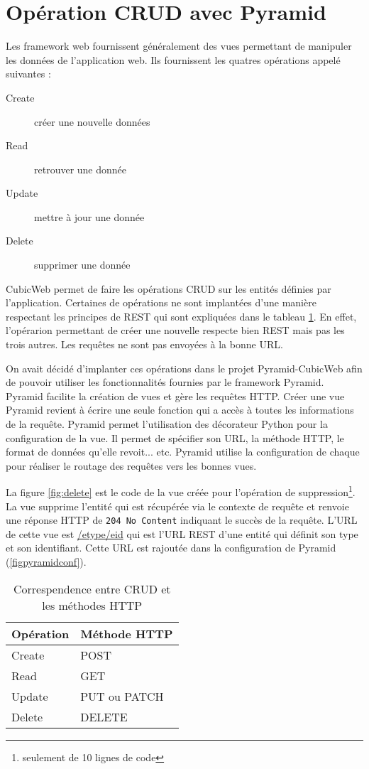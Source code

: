 \section{Opération CRUD avec Pyramid}
Les framework web fournissent généralement des vues permettant de manipuler les données de l'application web. Ils fournissent les quatres opérations appelé  suivantes :
\begin{description}
    \item[Create] créer une nouvelle données
    \item[Read] retrouver une donnée
    \item[Update] mettre à jour une donnée
    \item[Delete] supprimer une donnée
\end{description}

CubicWeb permet de faire les opérations CRUD sur les entités définies par l'application. Certaines de opérations ne sont implantées d'une manière respectant les principes de REST qui sont expliquées dans le tableau \ref{table:crud}. En effet, l'opérarion permettant de créer une nouvelle respecte bien REST mais pas les trois autres. Les requêtes ne sont pas envoyées à la bonne URL.

On avait décidé d'implanter ces opérations dans le projet Pyramid-CubicWeb afin de pouvoir utiliser les fonctionnalités fournies par le framework Pyramid. Pyramid facilite la création de vues et gère les requêtes HTTP. Créer une vue Pyramid revient à écrire une seule fonction qui a accès à toutes les informations de la requête. Pyramid permet l'utilisation des décorateur Python pour la configuration de la vue. Il permet de spécifier son URL, la méthode HTTP, le format de données qu'elle revoit... etc. Pyramid utilise la configuration de chaque pour réaliser le routage des requêtes vers les bonnes vues. 

La figure \ref{fig:delete} est le code de la vue créée pour l'opération de suppression\footnote{seulement de 10 lignes de code}. La vue supprime l'entité qui est récupérée via le contexte de requête et renvoie une réponse HTTP de \texttt{204 No Content} indiquant le succès de la requête. L'URL de cette vue est \url{/etype/eid} qui est l'URL REST d'une entité qui définit son type et son identifiant. Cette URL est rajoutée dans la configuration de Pyramid (\ref{figpyramidconf}).

    \begin{table}
        \centering
        \begin{tabular}{|>{\centering\arraybackslash}m{}|>{\centering\arraybackslash}m{}|}
        \hline
        \cellcolor{Gray} \textbf{Opération} & 
        \cellcolor{Gray} \textbf{Méthode HTTP} \\ \hline
        Create & POST \\ \hline
        Read   & GET \\ \hline
        Update & PUT ou PATCH \\ \hline
        Delete & DELETE \\ \hline
    \end{tabular}
    \caption{Correspendence entre CRUD et les méthodes HTTP}
    \label{table:crud}
\end{table}


